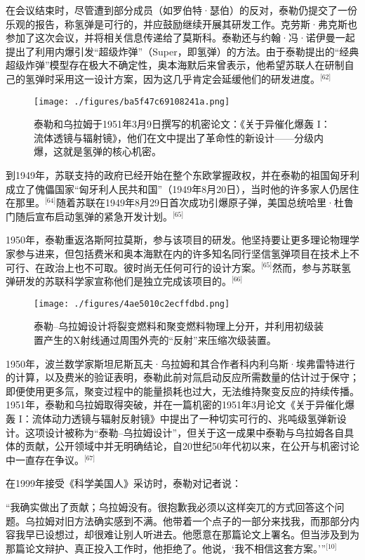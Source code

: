 在会议结束时，尽管遭到部分成员（如罗伯特·瑟伯）的反对，泰勒仍提交了一份乐观的报告，称氢弹是可行的，并应鼓励继续开展其研发工作。克劳斯·弗克斯也参加了这次会议，并将相关信息传递给了莫斯科。泰勒还与约翰·冯·诺伊曼一起提出了利用内爆引发“超级炸弹”（Super，即氢弹）的方法。由于泰勒提出的“经典超级炸弹”模型存在极大不确定性，奥本海默后来曾表示，他希望苏联人在研制自己的氢弹时采用这一设计方案，因为这几乎肯定会延缓他们的研发进度。\(^\text{[62]}\)
\begin{figure}[ht]
\centering
\texttt{[image: ./figures/ba5f47c69108241a.png]}
\caption{泰勒和乌拉姆于1951年3月9日撰写的机密论文：《关于异催化爆轰 I：流体透镜与辐射镜》，他们在文中提出了革命性的新设计——分级内爆，这就是氢弹的核心机密。} \label{fig_ADHTL_6}
\end{figure}
到1949年，苏联支持的政府已经开始在整个东欧掌握政权，并在泰勒的祖国匈牙利成立了傀儡国家“匈牙利人民共和国”（1949年8月20日），当时他的许多家人仍居住在那里。\(^\text{[64]}\)随着苏联在1949年8月29日首次成功引爆原子弹，美国总统哈里·杜鲁门随后宣布启动氢弹的紧急开发计划。\(^\text{[65]}\)

1950年，泰勒重返洛斯阿拉莫斯，参与该项目的研发。他坚持要让更多理论物理学家参与进来，但包括费米和奥本海默在内的许多知名同行坚信氢弹项目在技术上不可行、在政治上也不可取。彼时尚无任何可行的设计方案。\(^\text{[65]}\)然而，参与苏联氢弹研发的苏联科学家宣称他们是独立完成该项目的。\(^\text{[66]}\)
\begin{figure}[ht]
\centering
\texttt{[image: ./figures/4ae5010c2ecffdbd.png]}
\caption{泰勒–乌拉姆设计将裂变燃料和聚变燃料物理上分开，并利用初级装置产生的X射线通过周围外壳的“反射”来压缩次级装置。} \label{fig_ADHTL_7}
\end{figure}
1950年，波兰数学家斯坦尼斯瓦夫·乌拉姆和其合作者科内利乌斯·埃弗雷特进行的计算，以及费米的验证表明，泰勒此前对氚启动反应所需数量的估计过于保守；即便使用更多氚，聚变过程中的能量损耗也过大，无法维持聚变反应的持续传播。1951年，泰勒和乌拉姆取得突破，并在一篇机密的1951年3月论文《关于异催化爆轰 I：流体动力透镜与辐射反射镜》中提出了一种切实可行的、兆吨级氢弹新设计。这项设计被称为“泰勒–乌拉姆设计”，但关于这一成果中泰勒与乌拉姆各自具体的贡献，公开领域中并无明确结论，自20世纪50年代初以来，在公开与机密讨论中一直存在争议。\(^\text{[67]}\)

在1999年接受《科学美国人》采访时，泰勒对记者说：

“我确实做出了贡献；乌拉姆没有。很抱歉我必须以这样突兀的方式回答这个问题。乌拉姆对旧方法确实感到不满。他带着一个点子的一部分来找我，而那部分内容我早已设想过，却很难让别人听进去。他愿意在那篇论文上署名。但当涉及到为那篇论文辩护、真正投入工作时，他拒绝了。他说，‘我不相信这套方案。’”\(^\text{[10]}\)

